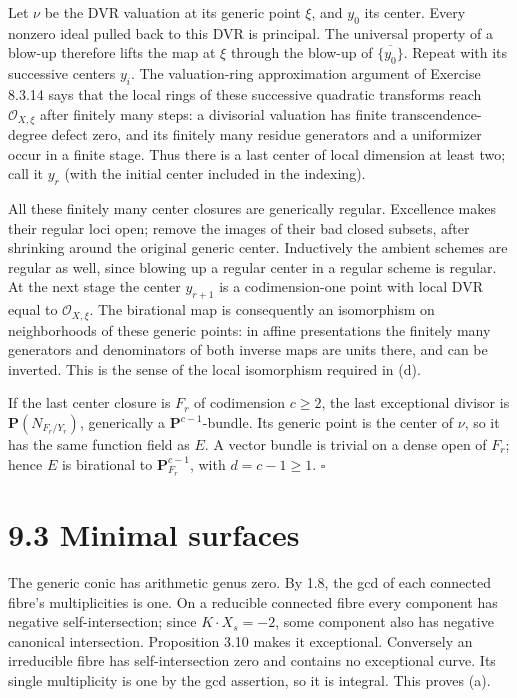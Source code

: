 \documentclass[11pt]{article}
\let\chapterexercise\exercise
\renewcommand{\exercise}[2]{\Needspace{8\baselineskip}\chapterexercise{#1}{#2}}
\begin{document}
\pf Let $\nu$ be the DVR valuation at its generic point $\xi$, and $y_0$ its center. Every nonzero ideal pulled back to this DVR is principal. The universal property of a blow-up therefore lifts the map at $\xi$ through the blow-up of $\overline{\{y_0\}}$. Repeat with its successive centers $y_i$. The valuation-ring approximation argument of Exercise 8.3.14 says that the local rings of these successive quadratic transforms reach $\mathcal O_{X,\xi}$ after finitely many steps: a divisorial valuation has finite transcendence-degree defect zero, and its finitely many residue generators and a uniformizer occur in a finite stage. Thus there is a last center of local dimension at least two; call it $y_r$ (with the initial center included in the indexing).

All these finitely many center closures are generically regular. Excellence makes their regular loci open; remove the images of their bad closed subsets, after shrinking around the original generic center. Inductively the ambient schemes are regular as well, since blowing up a regular center in a regular scheme is regular. At the next stage the center $y_{r+1}$ is a codimension-one point with local DVR equal to $\mathcal O_{X,\xi}$. The birational map is consequently an isomorphism on neighborhoods of these generic points: in affine presentations the finitely many generators and denominators of both inverse maps are units there, and can be inverted. This is the sense of the local isomorphism required in (d).

If the last center closure is $F_r$ of codimension $c\ge2$, the last exceptional divisor is $\mathbf P(N_{F_r/Y_r})$, generically a $\mathbf P^{c-1}$-bundle. Its generic point is the center of $\nu$, so it has the same function field as $E$. A vector bundle is trivial on a dense open of $F_r$; hence $E$ is birational to $\mathbf P^{c-1}_{F_r}$, with $d=c-1\ge1$. \hfill$\square$

\section*{9.3 Minimal surfaces}

\pf The generic conic has arithmetic genus zero. By 1.8, the gcd of each connected fibre's multiplicities is one. On a reducible connected fibre every component has negative self-intersection; since $K\cdot X_s=-2$, some component also has negative canonical intersection. Proposition 3.10 makes it exceptional. Conversely an irreducible fibre has self-intersection zero and contains no exceptional curve. Its single multiplicity is one by the gcd assertion, so it is integral. This proves (a).
\end{document}
